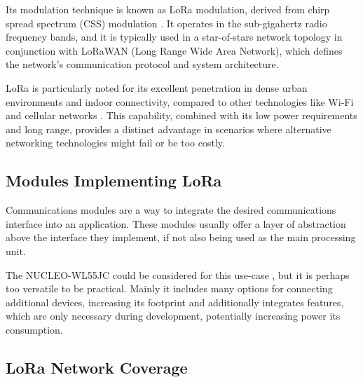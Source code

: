 Its modulation technique is known as LoRa modulation, derived from chirp spread spectrum (CSS) modulation \cite{semtech_corporation_sx12612_2024}. It operates in the sub-gigahertz radio frequency bands, and it is typically used in a star-of-stars network topology in conjunction with LoRaWAN (Long Range Wide Area Network), which defines the network's communication protocol and system architecture.

LoRa is particularly noted for its excellent penetration in dense urban environments and indoor connectivity, compared to other technologies like Wi-Fi and cellular networks \cite{stmicroelectronics_lora_2024,semtech_corporation_sx12612_2024,seeedstudio_wio-e5-wireless_2024}. This capability, combined with its low power requirements and long range, provides a distinct advantage in scenarios where alternative networking technologies might fail or be too costly.

\subsection{Modules Implementing LoRa}
Communications modules are a way to integrate the desired communications interface into an application. These modules usually offer a layer of abstraction above the interface they implement, if not also being used as the main processing unit.

The NUCLEO-WL55JC could be considered for this use-case \cite{stmicroelectronics_nucleo-wl55jc_2024}, but it is perhaps too versatile to be practical. Mainly it includes many options for connecting additional devices, increasing its footprint and additionally integrates features, which are only necessary during development, potentially increasing power its consumption.

\subsection{LoRa Network Coverage}
